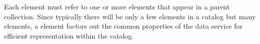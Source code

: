 Each  element must refer to one or more
 elements that appear in a parent collection. Since
typically there will be only a few  elements in a
catalog but many  elements, a 
element factors out the common properties of the data service for
efficient representation within the catalog.


\begin{comment}

\section{Validation}

<ul>
<li>
<b>Dataset (1) <datasetName>: has unknown service named <serviceName></b></li>

<ul>
<li>
<datasetName> declares a service <serviceName> that cannot be found.
(FATAL)</li>
</ul>

<li>
<b>Dataset (2) <datasetName>: is selectable but no data type declared
in it or in a parent element</b></li>

<ul>
<li>
no dataType attribute was declared in a selectable dataset element or in
any parent (WARN)</li>
</ul>

<li>
<b>Dataset (3) <datasetName>: is not selectable and does not have nested
datasets</b></li>

<ul>
<li>
this dataset has no use (WARN)</li>
</ul>

<li>
<b>Dataset Access (1) <datasetName>: has unknown service named <ServiceName></b></li>

<ul>
<li>
cannot find a service of the given name within a parent element (FATAL)</li>
</ul>

<li>
<b>Dataset Access (2) <datasetName>: cannot declare service <ServiceName>
and serviceType <ServiceTypeName></b></li>

<ul>
<li>
the ServiceType will be ignored (WARN)</li>
</ul>

<li>
<b>Dataset Access (3) <datasetName>: urlPath bad syntax <urlPath></b></li>

<ul>
<li>
urlPath could not be parsed as a URI reference (FATAL)</li>
</ul>

<li>
<b>Dataset Access (4) <datasetName>: urlPath must be absolute <urlPath></b></li>

<ul>
<li>
urlPath must be absolute when you create an "anonymous" service by specifying
a serviceType but no serviceName (FATAL)</li>
</ul>


\end{comment}
